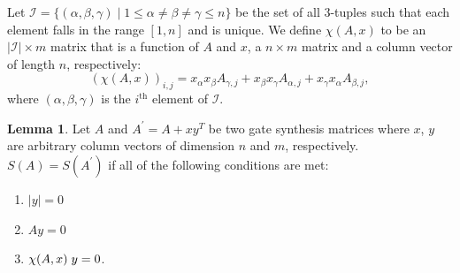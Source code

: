 \documentclass{article}
\theoremstyle{definition}
\theoremstyle{problem}
\theoremstyle{lemma}
\newtheorem{lemma}{Lemma}[section]
\begin{document}
		Let $\mathcal{I} = \{\left(\alpha,\beta,\gamma\right)\mid 1 \leq \alpha \neq \beta \neq \gamma \leq n\}$ be the set of all 3-tuples such that each element falls in the range $\left[1,n\right]$ and is unique. We define $\chi(A,x)$ to be an $|\mathcal{I}| \times m$ matrix that is a function of $A$ and $x$, a $n \times m$ matrix and a column vector of length $n$, respectively:
		\begin{equation}
		\left(\chi(A,x)\right)_{i,j} = x_\alpha x_\beta A_{\gamma,j} + x_\beta x_\gamma A_{\alpha,j} + x_\gamma x_\alpha A_{\beta,j},
		\end{equation}
		where $\left(\alpha,\beta,\gamma\right)$ is the $i^\text{th}$ element of $\mathcal{I}$.
		
		\theoremstyle{lemma}
		\begin{lemma}{}
			Let $A$ and $A^\prime = A + xy^T$ be two gate synthesis matrices where $x$, $y$ are arbitrary column vectors of dimension $n$ and $m$, respectively. $S(A) = S(A^\prime)$ if all of the following conditions are met:
			\begin{enumerate}
				\item $|y| = 0$
				\item $Ay = 0$
				\item $\chi(A,x)\hspace{1mm}y = 0$.
			\end{enumerate}
		\end{lemma}
\end{document}
